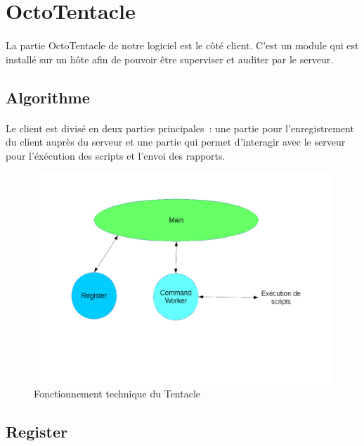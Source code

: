 \section{OctoTentacle}
\paragraph{}
La partie OctoTentacle de notre logiciel est le côté client. C'est un module qui est installé sur un hôte afin de pouvoir être superviser et auditer par le serveur.

\subsection{Algorithme}
\paragraph{}
Le client est divisé en deux parties principales : une partie pour l'enregistrement du client auprès du serveur et une partie qui permet d'interagir avec le serveur pour l'éxécution des scripts et l'envoi des rapports.

\begin{figure}[!h]
    \begin{center}
        \includegraphics[width=1\textwidth]{img/algo_tentacle.png}
        \caption{Fonctionnement technique du Tentacle}
    \end{center} 
\end{figure}

\subsection{Register}
